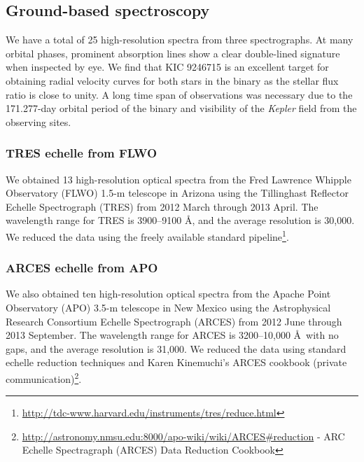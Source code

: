 \subsection{Ground-based spectroscopy}\label{spectra}
We have a total of 25 high-resolution spectra from three spectrographs. At many orbital phases, prominent absorption lines show a clear double-lined signature when inspected by eye. We find that KIC 9246715 is an excellent target for obtaining radial velocity curves for both stars in the binary as the stellar flux ratio is close to unity. A long time span of observations was necessary due to the 171.277-day orbital period of the binary and visibility of the \emph{Kepler} field from the observing sites.

\subsubsection{TRES echelle from FLWO}\label{tres}
We obtained 13 high-resolution optical spectra from the Fred Lawrence Whipple Observatory (FLWO) 1.5-m telescope in Arizona using the Tillinghast Reflector Echelle Spectrograph (TRES) from 2012 March through 2013 April. The wavelength range for TRES is 3900--9100 \AA, and the average resolution is 30,000. We reduced the data using the freely available standard pipeline\footnote{\url{http://tdc-www.harvard.edu/instruments/tres/reduce.html}}.

\subsubsection{ARCES echelle from APO}\label{arces}
We also obtained ten high-resolution optical spectra from the Apache Point Observatory (APO) 3.5-m telescope in New Mexico using the Astrophysical Research Consortium Echelle Spectrograph (ARCES) from 2012 June through 2013 September. The wavelength range for ARCES is 3200--10,000 \AA \ with no gaps, and the average resolution is 31,000. We reduced the data using standard echelle reduction techniques and Karen Kinemuchi's ARCES cookbook (private communication)\footnote{\url{http://astronomy.nmsu.edu:8000/apo-wiki/wiki/ARCES\#reduction} - ARC Echelle Spectragraph (ARCES) Data Reduction Cookbook}.

